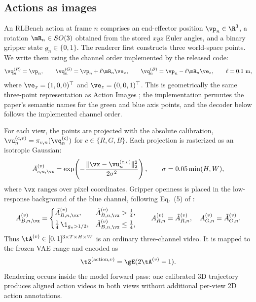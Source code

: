 \subsection{Actions as images}
\label{sec:prelim-actionimages}

An RLBench action at frame $n$ comprises an end-effector position $\vp_n\in\R^3$, a rotation
$\mR_n\in SO(3)$ obtained from the stored $xyz$ Euler angles, and a binary gripper state
$g_n\in\{0,1\}$. The renderer first constructs three world-space points. We write them using the
channel order implemented by the released code:
\begin{equation}
    \vq^{(R)}_n=\vp_n,
    \qquad
    \vq^{(G)}_n=\vp_n+\ell\mR_n\ve_x,
    \qquad
    \vq^{(B)}_n=\vp_n-\ell\mR_n\ve_z,
    \qquad \ell=0.1\ \mathrm{m},
    \label{eq:prelim-actionpoints}
\end{equation}
where $\ve_x=(1,0,0)^{\top}$ and $\ve_z=(0,0,1)^{\top}$. This is geometrically the same
three-point representation as Action Images \citep{zhen2026action}; the implementation permutes
the paper's semantic names for the green and blue axis points, and the decoder below follows the
implemented channel order.

For each view, the points are projected with the absolute calibration,
$\vu^{(c,v)}_n=\pi_{v,n}(\vq^{(c)}_n)$ for $c\in\{R,G,B\}$. Each projection is rasterized as an
isotropic Gaussian:
\begin{equation}
    \tilde A^{(v)}_{c,n,\vx}
    =\exp\!\left(-\frac{\|\vx-\vu^{(c,v)}_n\|_2^2}{2\sigma^2}\right),
    \qquad
    \sigma=0.05\min(H,W),
    \label{eq:prelim-actionimage}
\end{equation}
where $\vx$ ranges over pixel coordinates. Gripper openness is placed in the low-response
background of the blue channel, following Eq.~(5) of \citet{zhen2026action}:
\begin{equation}
    A^{(v)}_{B,n,\vx}=
    \begin{cases}
        \tilde A^{(v)}_{B,n,\vx},
        & \tilde A^{(v)}_{B,n,\vx}>\tfrac14,\\[2pt]
        \tfrac14\,\1_{g_n>1/2},
        & \tilde A^{(v)}_{B,n,\vx}\leq\tfrac14,
    \end{cases}
    \qquad
    A^{(v)}_{R,n}=\tilde A^{(v)}_{R,n},\quad
    A^{(v)}_{G,n}=\tilde A^{(v)}_{G,n}.
    \label{eq:prelim-openness}
\end{equation}
Thus $\tA^{(v)}\in[0,1]^{3\times T\times H\times W}$ is an ordinary three-channel video. It is
mapped to the frozen VAE range and encoded as
\begin{equation}
    \tZ^{(\mathrm{action},v)}=\gE(2\tA^{(v)}-1).
    \label{eq:prelim-action-latent}
\end{equation}
Rendering occurs inside the model forward pass: one calibrated 3D trajectory produces aligned
action videos in both views without additional per-view 2D action annotations.

